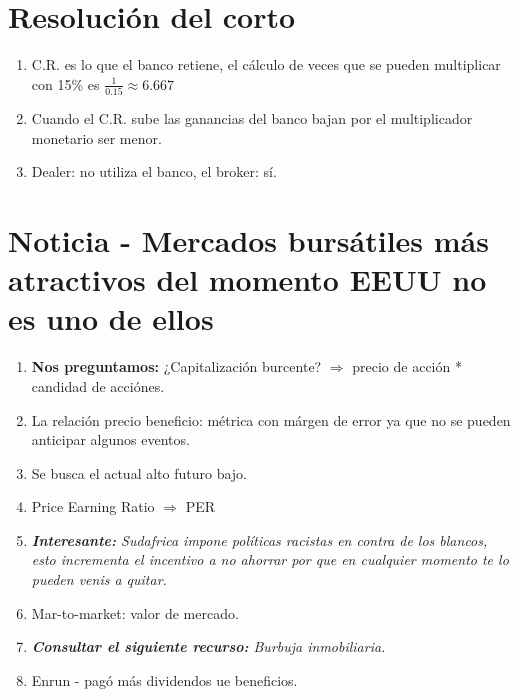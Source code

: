 \section{Resolución del corto}
\begin{enumerate}
    \item C.R. es lo que el banco retiene, el cálculo de veces que se pueden multiplicar con 15\% es $\frac{1}{0.15} \approx 6.667 $
    \item Cuando el C.R. sube las ganancias del banco bajan por el multiplicador monetario ser menor.
    \item Dealer: no utiliza el banco, el broker: sí.
\end{enumerate}

\section{Noticia - Mercados bursátiles más atractivos del momento EEUU no es uno de ellos}
\begin{enumerate}
    \item \textbf{Nos preguntamos:} ¿Capitalización burcente? $\Rightarrow$ precio de acción * candidad de acciónes.
    \item La relación precio beneficio: métrica con márgen de error ya que no se pueden anticipar algunos eventos.
    \item Se busca el actual alto futuro bajo.
    \item Price Earning Ratio $\Rightarrow$ PER 
    \item \emph{\textbf{Interesante:} Sudafrica impone políticas racistas en contra de los blancos, esto incrementa el incentivo a no ahorrar por que en cualquier momento te lo pueden venis a quitar.}
    \item Mar-to-market: valor de mercado.
    \item \emph{\textbf{Consultar el siguiente recurso:} Burbuja inmobiliaria.}
    \item Enrun - pagó más dividendos ue beneficios. 
\end{enumerate}

